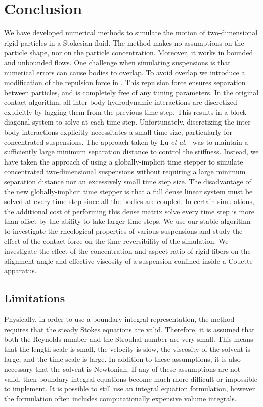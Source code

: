 \chapter{Conclusion}

We have developed numerical methods to simulate the motion of two-dimensional rigid particles in a Stokesian fluid. The method makes no assumptions on the particle shape, nor on the particle concentration. Moreover, it works in bounded and unbounded flows. One challenge when simulating suspensions is that numerical errors can cause bodies to overlap. To avoid overlap we introduce a modification of the repulsion force in \cite{Lu2017}. This repulsion force ensures separation between particles, and is completely free of any tuning parameters. In the original contact algorithm, all inter-body hydrodynamic interactions are discretized explicitly by lagging them from the previous time step. This results in a block-diagonal system to solve at each time step. Unfortunately, discretizing the  inter-body interactions explicitly necessitates a small time size, particularly for concentrated suspensions. The approach taken by Lu \emph{et al.}~\cite{Lu2017} was to maintain a sufficiently large minimum separation distance to control the stiffness. Instead, we have taken the approach of using a globally-implicit time stepper to simulate concentrated two-dimensional suspensions without requiring  a large minimum separation distance nor an excessively small time step size. The disadvantage of the new globally-implicit time stepper is that a full dense linear system must be solved at every time step since all the bodies are coupled. In certain simulations, the additional cost of performing this dense matrix solve every time step is more than offset by the ability to take larger time steps. We use our stable algorithm to investigate the rheological properties of various suspensions and study the effect of the contact force on the time reversibility of the simulation. We investigate the effect of the concentration and aspect ratio of rigid fibers on the alignment angle and effective viscosity of a suspension confined inside a Couette apparatus. 


\section{Limitations}

Physically, in order to use a boundary integral representation, the method requires that the steady Stokes equations are valid. Therefore, it is assumed  that both the Reynolds number and the Strouhal number are very small. This means that the length scale is small, the velocity is slow, the viscosity of the solvent is large, and the time scale is large. In addition to these assumptions, it is also necessary that the solvent is Newtonian. If any of these assumptions are not valid, then boundary integral equations become much more difficult or impossible to implement. It is possible to still use an integral equation formulation, however the formulation often includes computationally expensive volume integrals.

